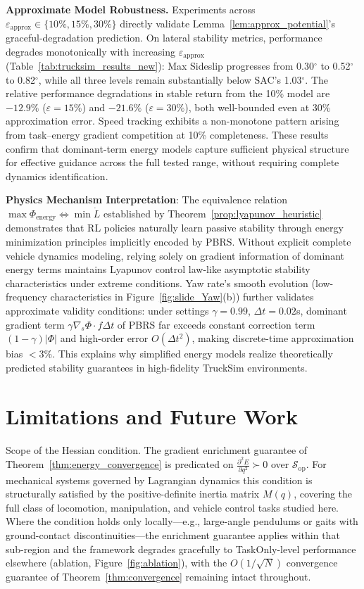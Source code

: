 \documentclass[journal]{IEEEtran}
\begin{document}
	\textbf{Approximate Model Robustness.} Experiments across $\varepsilon_{\text{approx}}\in\{10\%,15\%,30\%\}$ directly validate Lemma~\ref{lem:approx_potential}'s graceful-degradation prediction. On lateral stability metrics, performance degrades monotonically with increasing $\varepsilon_{\text{approx}}$ (Table~\ref{tab:trucksim_results_new}): Max Sideslip progresses from 0.30$^\circ$ to 0.52$^\circ$ to 0.82$^\circ$, while all three levels remain substantially below SAC's 1.03$^\circ$. The relative performance degradations in stable return from the 10\% model are $-12.9\%$ ($\varepsilon{=}15\%$) and $-21.6\%$ ($\varepsilon{=}30\%$), both well-bounded even at 30\% approximation error. Speed tracking exhibits a non-monotone pattern arising from task--energy gradient competition at 10\% completeness. These results confirm that dominant-term energy models capture sufficient physical structure for effective guidance across the full tested range, without requiring complete dynamics identification.
	
	\textbf{Physics Mechanism Interpretation}: The equivalence relation $\max \Phi_{\text{energy}} \Leftrightarrow \min \dot{L}$ established by Theorem~\ref{prop:lyapunov_heuristic} demonstrates that RL policies naturally learn passive stability through energy minimization principles implicitly encoded by PBRS. Without explicit complete vehicle dynamics modeling, relying solely on gradient information of dominant energy terms maintains Lyapunov control law-like asymptotic stability characteristics under extreme conditions. Yaw rate's smooth evolution (low-frequency characteristics in Figure~\ref{fig:slide_Yaw}(b)) further validates approximate validity conditions: under settings $\gamma=0.99$, $\Delta t=0.02$s, dominant gradient term $\gamma\nabla_s\Phi \cdot f\Delta t$ of PBRS far exceeds constant correction term $(1-\gamma)|\Phi|$ and high-order error $O(\Delta t^2)$, making discrete-time approximation bias $<$3\%. This explains why simplified energy models realize theoretically predicted stability guarantees in high-fidelity TruckSim environments.
	
	\section{Limitations and Future Work}
	
	Scope of the Hessian condition. The gradient enrichment guarantee of Theorem~\ref{thm:energy_convergence} is predicated on $\frac{\partial^2 E}{\partial q^2}\succ 0$ over $\mathcal{S}_{\text{op}}$. For mechanical systems governed by Lagrangian dynamics this condition is structurally satisfied by the positive-definite inertia matrix $M(q)$, covering the full class of locomotion, manipulation, and vehicle control tasks studied here. Where the condition holds only locally---e.g., large-angle pendulums or gaits with ground-contact discontinuities---the enrichment guarantee applies within that sub-region and the framework degrades gracefully to TaskOnly-level performance elsewhere (ablation, Figure~\ref{fig:ablation}), with the $O(1/\sqrt{N})$ convergence guarantee of Theorem~\ref{thm:convergence} remaining intact throughout.
	
\end{document}
